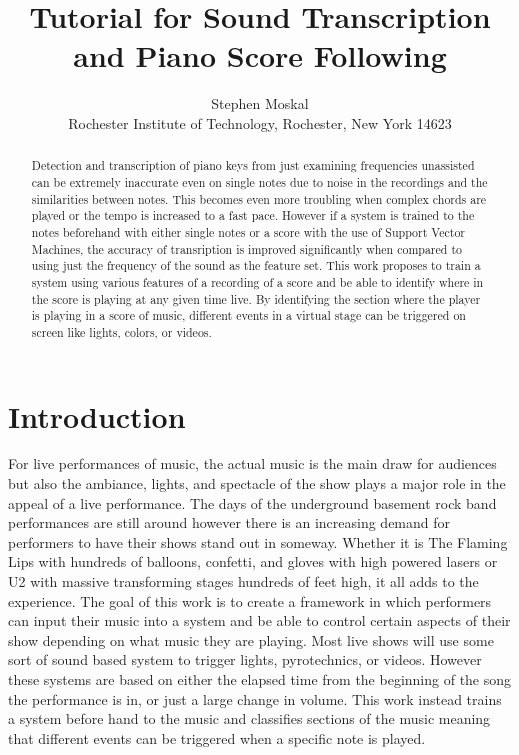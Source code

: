 \documentclass[conference]{IEEEtran}
\begin{document}
\title{Tutorial for Sound Transcription and Piano Score Following\\
\vspace*{-20pt}}

\author{Stephen Moskal\\
Rochester Institute of Technology, Rochester, New York 14623
}
\maketitle

\begin{abstract}
Detection and transcription of piano keys from just examining frequencies unassisted can be extremely inaccurate even on single notes due to noise in the recordings and the similarities between notes.  This becomes even more troubling when complex chords are played or the tempo is increased to a fast pace.  However if a system is trained to the notes beforehand with either single notes or a score with the use of Support Vector Machines, the accuracy of transription is improved significantly when compared to using just the frequency of the sound as the feature set.  This work proposes to train a system using various features of a recording of a score and be able to identify where in the score is playing at any given time live.  By identifying the section where the player is playing in a score of music, different events in a virtual stage can be triggered on screen like lights, colors, or videos.
\end{abstract}

\section{Introduction}
\label{sec:intro}
For live performances of music, the actual music is the main draw for audiences but also the ambiance, lights, and spectacle of the show plays a major role in the appeal of a live performance.  The days of the underground basement rock band performances are still around however there is an increasing demand for performers to have their shows stand out in someway.  Whether it is The Flaming Lips with hundreds of balloons, confetti, and gloves with high powered lasers or U2 with massive transforming stages hundreds of feet high, it all adds to the experience.  The goal of this work is to create a framework in which performers can input their music into a system and be able to control certain aspects of their show depending on what music they are playing.  Most live shows will use some sort of sound based system to trigger lights, pyrotechnics, or videos.  However these systems are based on either the elapsed time from the beginning of the song the performance is in, or just a large change in volume.  This work instead trains a system before hand to the music and classifies sections of the music meaning that different events can be triggered when a specific note is played.
\end{document}
